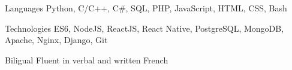 


\begin{cvskills}

\cvskill
{Languages} %
{Python, C/C++, C\#, SQL, PHP, JavaScript, HTML, CSS, Bash} %


\cvskill
{Technologies} %
{ES6, NodeJS, ReactJS, React Native, PostgreSQL, MongoDB, Apache, Nginx, Django, Git} %


\cvskill
{Biligual} %
{Fluent in verbal and written French} %


\end{cvskills}
\addvspace{2ex}
